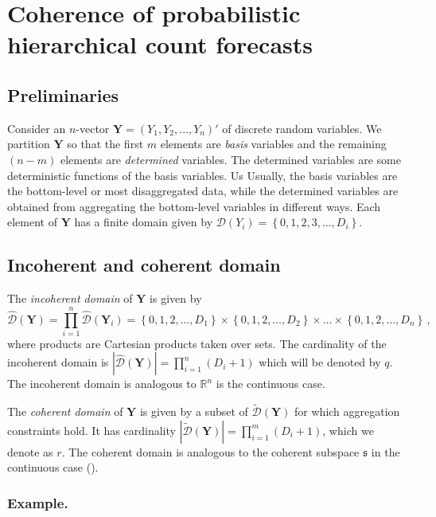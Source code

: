 \documentclass[a4paper,review,12pt,authoryear]{elsarticle}
\newcommand{\bY}{\mathbf{Y}}
\begin{document}
\section{Coherence of probabilistic hierarchical count forecasts}

\label{sec:coherence}

	
\subsection{Preliminaries}
Consider an $n$-vector $\bY=\left(Y_1,Y_2,\ldots,Y_n\right)'$ of discrete random variables.
We partition $\bY$ so that the first $m$ elements are \textit{basis} variables and the remaining $(n-m)$ elements are \textit{determined} variables.
The determined variables are some deterministic functions of the basis variables. Us
Usually, the basis variables are the bottom-level or most disaggregated data, while the determined variables are obtained from aggregating the bottom-level variables in different ways. 
Each element of $\bY$ has a finite domain given by $\mathcal{D}(Y_i)=\left\{0, 1,2,3,\dots,D_i\right\}$.

\subsection{Incoherent and coherent domain}
The \textit{incoherent domain} of $\bY$ is given by
\[
\hat{\mathcal D}(\bY)=\prod\limits_{i=1}^n\hat{\mathcal D}(\bY_i)=\left\{0, 1,2,\dots,D_1\right\}\times\left\{0,1,2,\dots,D_2\right\}\times\dots\times\left\{0,1,2,\dots,D_n\right\}\,,
\] 
where products are Cartesian products taken over sets. 
The cardinality of the incoherent domain is $|\hat{\mathcal D}(\bY)|=\prod\limits_{i=1}^{n} (D_i+1)$ which will be denoted by $q$. 
The incoherent domain is analogous to $\mathbb{R}^n$ is the continuous case.
  
The \textit{coherent domain} of $\bY$ is given by a subset of $\tilde{\mathcal D}(\bY)$ for which aggregation constraints hold.  
It has cardinality $|\tilde{\mathcal D}(\bY)|=\prod\limits_{i=1}^{m} (D_i+1)$, which we denote as $r$. 
The coherent domain is analogous to the coherent subspace $\mathfrak{s}$ in the continuous case (\citealp{panagiotelisProbabilisticForecastReconciliation2022}).
  
  \subsubsection*{\textbf{Example}.}
  \label{sec:example}
  
\end{document}
